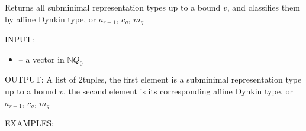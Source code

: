 \documentclass[letterpaper,10pt,english]{sphinxmanual}
\begin{document}
\begin{fulllineitems}
\label{\detokenize{index:quivercombinatorics.quivercombinatorics.Quiver.all_subminimal_representation_types}}
\pysigstartsignatures
\pysiglinewithargsret
{}
{}
{}
\pysigstopsignatures
\sphinxAtStartPar
Returns all subminimal representation types up to a bound \(v\), and classifies them by affine Dynkin type, or \(a_{r-1}\), \(c_{g}\), \(m_{g}\)

\sphinxAtStartPar
INPUT:
\begin{itemize}
\item {} 
\sphinxAtStartPar
{} – a vector in \(\mathbb{N}Q_0\)

\end{itemize}

\sphinxAtStartPar
OUTPUT: A list of 2\sphinxhyphen{}tuples, the first element is a subminimal representation type up to a bound \(v\), the second element is its corresponding affine Dynkin type, or \(a_{r-1}\), \(c_{g}\), \(m_{g}\)

\sphinxAtStartPar
EXAMPLES:


\end{fulllineitems}
\end{document}
